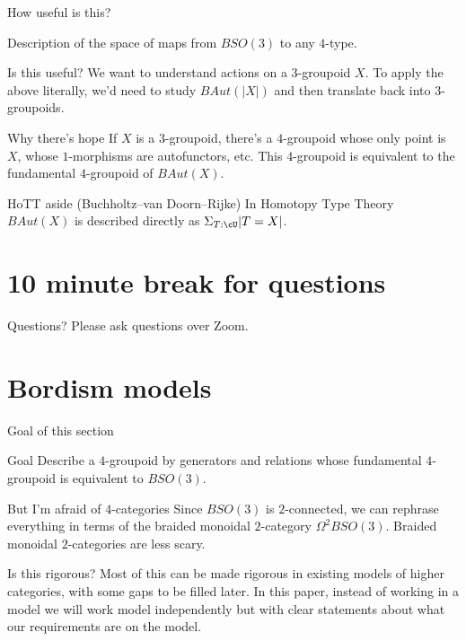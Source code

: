 \documentclass[beamer]{beamer}
\begin{document}
\begin{frame}{How useful is this?}

\begin{corollary}
Description of the space of maps from $BSO(3)$ to any $4$-type.
\end{corollary}

\begin{block}{Is this useful?}
We want to understand actions on a $3$-groupoid $X$.  To apply the above literally, we'd need to study $BAut(|X|)$ and then translate back into $3$-groupoids.
\end{block}

\begin{block}{Why there's hope}
If $X$ is a $3$-groupoid, there's a $4$-groupoid whose only point is $X$, whose $1$-morphisms are autofunctors, etc.  This $4$-groupoid is equivalent to the fundamental $4$-groupoid of $BAut(X)$.
\end{block}

\begin{block}{HoTT aside (Buchholtz--van Doorn--Rijke)}
In Homotopy Type Theory $BAut(X)$ is described directly as $\Sigma_{T: \cU} | T = X |$.
\end{block}

\end{frame}

\section{10 minute break for questions}

\begin{frame}{Questions?}
Please ask questions over Zoom.
\end{frame}

\section{Bordism models}

\begin{frame}{Goal of this section}
\begin{block}{Goal}
Describe a $4$-groupoid by generators and relations whose fundamental $4$-groupoid is equivalent to $BSO(3)$.
\end{block}

\begin{block}{But I'm afraid of $4$-categories}
Since $BSO(3)$ is $2$-connected, we can rephrase everything in terms of the braided monoidal $2$-category $\Omega^2BSO(3)$.  Braided monoidal $2$-categories are less scary.
\end{block}

\begin{block}{Is this rigorous?}
Most of this can be made rigorous in existing models of higher categories, with some gaps to be filled later.  In this paper, instead of working in a model we will work model independently but with clear statements about what our requirements are on the model.
\end{block}

\end{frame}
\end{document}
